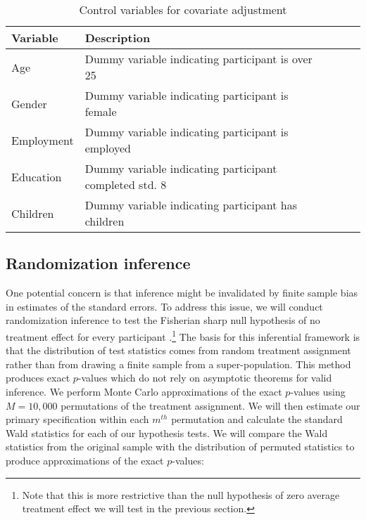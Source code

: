 \documentclass[11pt, a4paper]{article}\usepackage[]{graphicx}\usepackage[]{color}
\begin{document}
        \begin{table}[h]
        \centering
        \caption{Control variables for covariate adjustment}
        \label{tab:controlvars}
        \begin{tabular}{@{}lllll@{}}
        \toprule
        Variable                                     & Description                                          &  &  &  \\ \midrule
        Age & Dummy variable indicating participant is over 25 &  &  &  \\
        Gender & Dummy variable indicating participant is female &  &  &  \\
        Employment & Dummy variable indicating participant is employed &  &  &  \\
        Education & Dummy variable indicating participant completed std. 8 &  &  &  \\
        Children & Dummy variable indicating participant has children &  &  &  \\
        \bottomrule
        \end{tabular}
        \end{table}

    \subsection{Randomization inference} %

        One potential concern is that inference might be invalidated by finite sample bias in estimates of the standard errors. To address this issue, we will conduct randomization inference to test the Fisherian sharp null hypothesis of no treatment effect for every participant \parencite{fisher_design_1935}.\footnote{Note that this is more restrictive than the null hypothesis of zero average treatment effect we will test in the previous section.} The basis for this inferential framework is that the distribution of test statistics comes from random treatment assignment rather than from drawing a finite sample from a super-population. This method produces exact $p$-values which do not rely on asymptotic theorems for valid inference. We perform Monte Carlo approximations of the exact $p$-values using $M=10,000$ permutations of the treatment assignment. We will then estimate our primary specification within each $m^{th}$ permutation and calculate the standard Wald statistics for each of our hypothesis tests. We will compare the Wald statistics from the original sample with the distribution of permuted statistics to produce approximations of the exact $p$-values:
\end{document}
